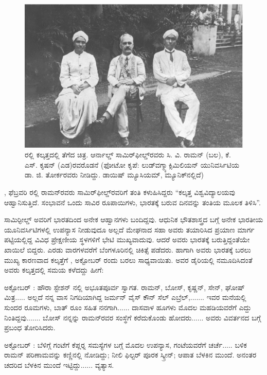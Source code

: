 \begin{figure}[!h]
\includegraphics[scale=0.23]{"images/3.jpg"}
\caption{ರಲ್ಲಿ ಕಲ್ಕತ್ತದಲ್ಲಿ ತೆಗೆದ ಚಿತ್ರ. ಆರ್ನಾಲ್ಡ್ ಸಾಮಿರ್‌ಫೀಲ್ಡ್‌ರವರು ಸಿ. ವಿ. ರಾಮನ್ (ಬಲ), ಕೆ. ಎಸ್. ಕೃಷನ್ (ಎಡ)ರವರೊಡನೆ (ಫೋಟೋ ಕೃಪೆ: ಲುಡ್‍ವಗ್\enginline{-}ಮ್ಯಾಕ್ಸಿಮಿಲಿಯನ್ ಯುನಿವರ್ಸಿಟಿಯ ಡಾ. ಜಿ. ತೋರ್ಕರವರು ನೀಡಿದ್ದು. ಡಾಯಿಷ್ ಮ್ಯೂಸಿಯಮ್, ಮ್ಯೂನಿಕ್‍ನಲ್ಲಿದೆ)}\label{chap1-fig04}
\end{figure}

, ಫೆಬ್ರವರಿ ರಲ್ಲಿ ರಾಮನ್‍ರವರು ಸಾಮಿರ್‌ಫೀಲ್ಡ್‌ರವರಿಗೆ ತಂತಿ ಕಳುಹಿಸಿದ್ದರು\enginline{-} “ಕಲ್ಕತ್ತ ವಿಶ್ವವಿದ್ಯಾಲಯವು ಆಹ್ವಾನಿಸುತ್ತಿದೆ. ಸಂಭಾವನೆ ಒಂದು ಸಾವಿರ ರೂಪಾಯಿಗಳು, ಭಾರತಕ್ಕೆ ಬರುವ ದಿನವನ್ನು ತಂತಿಯ ಮೂಲಕ ತಿಳಿಸಿ”.

ಸಾಮಿರ್‍ಫೀಲ್ಡ್ ಅವರಿಗೆ ಭಾರತದಿಂದ ಅನೇಕ ಆಹ್ವಾನಗಳು ಬಂದಿದ್ದವು. ಆಧುನಿಕ ಭೌತಶಾಸ್ತ್ರದ ಬಗ್ಗೆ ಅನೇಕ ಭಾರತೀಯ ಯೂನಿವರ್ಸಿಟಿಗಳಲ್ಲಿ ಉಪನ್ಯಾಸ ನೀಡುವುದೂ ಅಲ್ಲದೆ ಮೇಘನಾದ ಸಹಾ ಅವರು ತಯಾರಿಸಿದ ಪ್ರಯಾಣ ಮಾರ್ಗ ಪಟ್ಟಿಯಲ್ಲಿದ್ದ ವಿವಿಧ ಪ್ರೇಕ್ಷಣೀಯ ಸ್ಥಳಗಳಿಗೆ ಭೇಟಿ ಮುಖ್ಯವಾದುವು. ಆದರೆ ಅವರು ಭಾರತಕ್ಕೆ ಬರುತ್ತಿದ್ದಂತೆಯೇ ಖಾಯಿಲೆ ಬಿದ್ದರು. ಎರಡು ವಾರಗಳವರೆಗೆ ಬೆಂಗಳೂರಿನಲ್ಲಿ ಚಿಕಿತ್ಸೆ ಪಡೆದರು. ಹಾಗಾಗಿ ಅವರು ಭಾರತಕ್ಕೆ ಬರಲು ಮುಖ್ಯ ಕಾರಣವಾದ ಕಲ್ಕತ್ತೆಗೆ , ಅಕ್ಟೋಬರ್ ರಂದು ಬರಲು ಸಾಧ್ಯವಾಯಿತು. ಅವರ ಡೈರಿಯಲ್ಲಿ ನಮೂದಿಸಿದಂತೆ ಅವರು ಕಲ್ಕತ್ತದಲ್ಲಿ ಸಮಯ ಕಳೆದದ್ದು ಹೀಗೆ:

ಅಕ್ಟೋಬರ್ : ಹೌರಾ ಸ್ಟೇಶನ್ ನಲ್ಲಿ ಅಭೂತಪೂರ್ವ ಸ್ವಾಗತ. ರಾಮನ್, ಬೋಸ್, ಕೃಷ್ಣನ್, ಸೇನ್, ಘೋಷ್ ಮಿತ್ರ..... ಅಲ್ಲದೆ ನನ್ನ ವಾಸ ನಿಗದಿಯಾಗಿದ್ದ ಜರ್ಮನ್ ವೈಸ್ ಕೌನ್ ಸೆಲ್ ಎಬ್ರೆಲ್,....... ಇವರ ಮನೆಯಲ್ಲಿ  ಸುಂದರ ರೂಮಗಳು, ಬಾತ್ ರೂಂ ಸಹಿತ ನನಗಾಗಿ...... ದಾಸವಾಳ ಹೂಗಳು ಮೊದಲ ಮಹಡಿಯವರೆಗೆ ಎದ್ದು ನಿಂತಿದ್ದವು....... ಬೋಸ್ ನನ್ನನ್ನು ರಾಮನ್‍ರವರ ಸಂಸ್ಥೆಗೆ ಕರೆದುಕೊಂಡು ಹೋದರು...... ಅವರು ವಿವರ್ತನದ ಬಗ್ಗೆ ಪ್ರಬಂಧ ತೋರಿಸಿದರು.

ಅಕ್ಟೋಬರ್ : ಬೆಳಿಗ್ಗೆ  ಗಂಟೆಗೆ ಕೆಪ್ಲರ್‍ನ ಸಮಸ್ಯೆಗಳ ಬಗ್ಗೆ ಮೊದಲ ಉಪನ್ಯಾಸ,  ಗಂಟೆಯವರೆಗೆ ಚರ್ಚೆ..... ಬಳಿಕ ರಾಮನ್ ಪರಿಣಾಮವನ್ನು ಕಣ್ಣಿನಲ್ಲಿ ನೋಡಿದ್ದು; ನೀಲಿ ಫಿಲ್ಟರ್ ಪೂರಕ ಸ್ಕ್ರೀನ್; ಆಪಾತ ಬೆಳಕಿನ ಮುಂದೆ. ಅನಂತರ ಚದರಿದ ಬೆಳಕಿನ ಮುಂದೆ ಇಟ್ಟಿದ್ದು...... ವ್ಯತ್ಯಾಸ.

